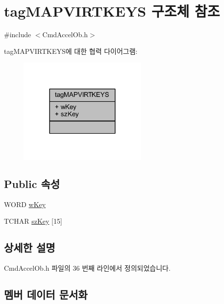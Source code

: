 \hypertarget{structtag_m_a_p_v_i_r_t_k_e_y_s}{}\section{tag\+M\+A\+P\+V\+I\+R\+T\+K\+E\+YS 구조체 참조}
\label{structtag_m_a_p_v_i_r_t_k_e_y_s}


{\ttfamily \#include $<$Cmd\+Accel\+Ob.\+h$>$}



tag\+M\+A\+P\+V\+I\+R\+T\+K\+E\+Y\+S에 대한 협력 다이어그램\+:\nopagebreak
\begin{figure}[H]
\begin{center}
\leavevmode
\includegraphics[width=180pt]{structtag_m_a_p_v_i_r_t_k_e_y_s__coll__graph}
\end{center}
\end{figure}
\subsection*{Public 속성}
\begin{DoxyCompactItemize}
\item 
W\+O\+RD \mbox{\hyperlink{structtag_m_a_p_v_i_r_t_k_e_y_s_aa21999ab90fcd0989352e3914fd796d7}{w\+Key}}
\item 
T\+C\+H\+AR \mbox{\hyperlink{structtag_m_a_p_v_i_r_t_k_e_y_s_a8450e89846bdbfa3f2daeec9583dfd15}{sz\+Key}} \mbox{[}15\mbox{]}
\end{DoxyCompactItemize}


\subsection{상세한 설명}


Cmd\+Accel\+Ob.\+h 파일의 36 번째 라인에서 정의되었습니다.



\subsection{멤버 데이터 문서화}
\mbox{\label{structtag_m_a_p_v_i_r_t_k_e_y_s_a8450e89846bdbfa3f2daeec9583dfd15}} 
